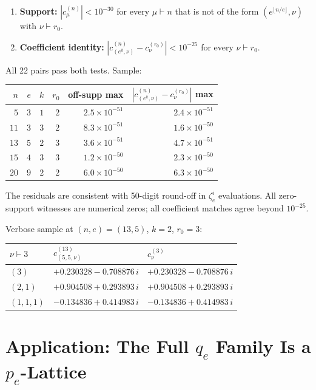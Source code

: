 \documentclass[11pt]{article}
\theoremstyle{remark}
\newcommand{\zetae}{\zeta_e}
\begin{document}
\begin{enumerate}
  \item \textbf{Support:} $|c_\mu^{(n)}| < 10^{-30}$ for every $\mu \vdash n$ that is not of the form $(e^{\lfloor n/e\rfloor}, \nu)$ with $\nu \vdash r_0$.
  \item \textbf{Coefficient identity:} $|c_{(e^k, \nu)}^{(n)} - c_\nu^{(r_0)}| < 10^{-25}$ for every $\nu \vdash r_0$.
\end{enumerate}

All 22 pairs pass both tests. Sample:
\begin{center}
\begin{tabular}{rrrr r r}
\hline
$n$ & $e$ & $k$ & $r_0$ & off-supp max & $|c^{(n)}_{(e^k,\nu)} - c^{(r_0)}_\nu|$ max \\
\hline
$5$  & $3$ & $1$ & $2$ & $2.5 \times 10^{-51}$ & $2.4 \times 10^{-51}$ \\
$11$ & $3$ & $3$ & $2$ & $8.3 \times 10^{-51}$ & $1.6 \times 10^{-50}$ \\
$13$ & $5$ & $2$ & $3$ & $3.6 \times 10^{-51}$ & $4.7 \times 10^{-51}$ \\
$15$ & $4$ & $3$ & $3$ & $1.2 \times 10^{-50}$ & $2.3 \times 10^{-50}$ \\
$20$ & $9$ & $2$ & $2$ & $6.0 \times 10^{-50}$ & $6.3 \times 10^{-50}$ \\
\hline
\end{tabular}
\end{center}
The residuals are consistent with 50-digit round-off in $\zetae^i$ evaluations. All zero-support witnesses are numerical zeros; all coefficient matches agree beyond $10^{-25}$.

Verbose sample at $(n, e) = (13, 5)$, $k = 2$, $r_0 = 3$:
\begin{center}
\begin{tabular}{lll}
\hline
$\nu \vdash 3$ & $c_{(5,5,\nu)}^{(13)}$ & $c_\nu^{(3)}$ \\
\hline
$(3)$      & $+0.230328 - 0.708876\,i$ & $+0.230328 - 0.708876\,i$ \\
$(2,1)$    & $+0.904508 + 0.293893\,i$ & $+0.904508 + 0.293893\,i$ \\
$(1,1,1)$  & $-0.134836 + 0.414983\,i$ & $-0.134836 + 0.414983\,i$ \\
\hline
\end{tabular}
\end{center}

\section{Application: The Full $q_e$ Family Is a $p_e$-Lattice}
\end{document}
